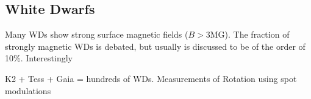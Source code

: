 {\color{red} \subsection{White Dwarfs}}
Many WDs show strong surface magnetic fields ($B>$3MG). The fraction of strongly magnetic WDs is debated, but usually is discussed to be of the order of 10\%. Interestingly  

K2 + Tess + Gaia = hundreds of WDs. Measurements of Rotation using spot modulations